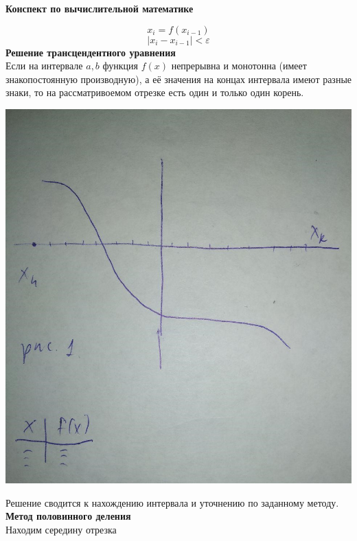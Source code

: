 \documentclass[11pt]{article}
\begin{document}
 
\begin{center}
\begin{Large}
\textbf{Конспект по вычислительной математике} \\
\end{Large}
\end{center}
\[x_i = f(x_{i-1})\]
\[|x_i - x_{i-1}| < \varepsilon\]
\textbf{Решение трансцендентного уравнения} \\

Если на интервале $a, b$ функция $f(x)$ непрерывна и монотонна (имеет знакопостоянную производную), а её значения на концах интервала имеют разные знаки, то на рассматривоемом отрезке есть один и только один корень.

\begin{center}
 \includegraphics[scale=0.5]{рис1.jpg}
 \end{center} 

Решение сводится к нахождению интервала и уточнению по заданному методу. \\

{\large\textbf{Метод половинного деления}} \\
Находим середину отрезка
\end{document}
